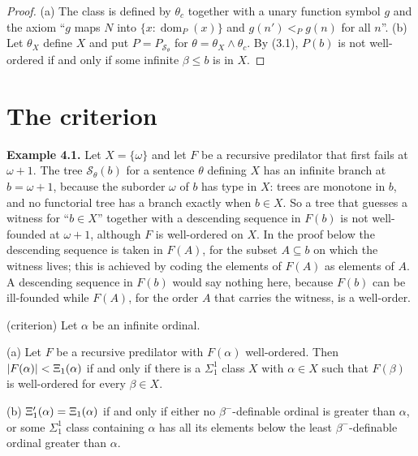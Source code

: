 \documentclass[11pt]{article}
\begin{document}
\begin{proof} (a) The class is defined by $\theta_c$ together with a unary function symbol $g$ and the axiom ``$g$ maps $N$ into
$\{x : \operatorname{dom}_P(x)\}$ and $g(n') <_P g(n)$ for all $n$''. (b) Let $\theta_X$ define $X$ and put
$P = P_{\mathcal S_\theta}$ for $\theta = \theta_X \wedge \theta_c$. By (3.1), $P(b)$ is not well-ordered if and
only if some infinite $\beta \le b$ is in $X$.
\end{proof}

\section{The criterion}

\textbf{Example 4.1.} Let $X = \{\omega\}$ and let $F$ be a recursive predilator that first fails at $\omega + 1$.
The tree $\mathcal S_\theta(b)$ for a sentence $\theta$ defining $X$ has an infinite branch at $b = \omega + 1$,
because the suborder $\omega$ of $b$ has type in $X$: trees are monotone in $b$, and no functorial tree has a
branch exactly when $b \in X$. So a tree that guesses a witness for ``$b \in X$'' together with a descending
sequence in $F(b)$ is not well-founded at $\omega + 1$, although $F$ is well-ordered on $X$. In the proof below the
descending sequence is taken in $F(A)$, for the subset $A \subseteq b$ on which the witness lives; this is achieved
by coding the elements of $F(A)$ as elements of $A$. A descending sequence in $F(b)$ would say nothing here,
because $F(b)$ can be ill-founded while $F(A)$, for the order $A$ that carries the witness, is a well-order.

\begin{statement} (criterion) Let $\alpha$ be an infinite ordinal.

(a) Let $F$ be a recursive predilator with $F(\alpha)$ well-ordered. Then $|F(\alpha)| < \Xi_1(\alpha)$ if and only if
there is a $\Sigma^1_1$ class $X$ with $\alpha \in X$ such that $F(\beta)$ is well-ordered for every $\beta \in X$.

(b) $\Xi'_1(\alpha) = \Xi_1(\alpha)$ if and only if either no $\beta^-$-definable ordinal is greater than $\alpha$, or
some $\Sigma^1_1$ class containing $\alpha$ has all its elements below the least $\beta^-$-definable ordinal greater
than $\alpha$.
\end{statement}
\end{document}
